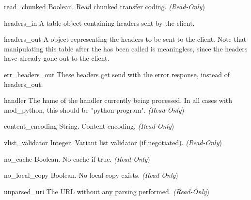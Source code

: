 \begin{memberdesc}[Request]{read_chunked}
Boolean. Read chunked transfer coding.
\emph{(Read-Only})
\end{memberdesc}

\begin{memberdesc}[Request]{headers_in}
A table object containing headers sent by the client.
\end{memberdesc}

\begin{memberdesc}[Request]{headers_out}
A  object representing the headers to be sent to the
client. Note that manipulating this table after the
 has been called is meaningless, since the
headers have already gone out to the client.
\end{memberdesc}

\begin{memberdesc}[Request]{err_headers_out}
These headers get send with the error response, instead of
headers_out.
\end{memberdesc}

\begin{memberdesc}[Request]{handler}
The hame of the handler currently being processed. In all cases with
mod_python, this should be "python-program".
\emph{(Read-Only})
\end{memberdesc}

\begin{memberdesc}[Request]{content_encoding}
String. Content encoding.
\emph{(Read-Only})
\end{memberdesc}

\begin{memberdesc}[Request]{vlist_validator}
Integer. Variant list validator (if negotiated).
\emph{(Read-Only})
\end{memberdesc}

\begin{memberdesc}[Request]{no_cache}
Boolean. No cache if true.
\emph{(Read-Only})
\end{memberdesc}

\begin{memberdesc}[Request]{no_local_copy}
Boolean. No local copy exists.
\emph{(Read-Only})
\end{memberdesc}

\begin{memberdesc}[Request]{unparsed_uri}
The URL without any parsing performed.
\emph{(Read-Only})
\end{memberdesc}

